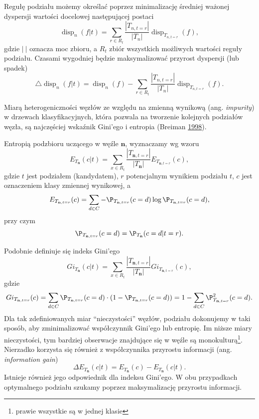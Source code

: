 \documentclass[]{book}
\let\rmarkdownfootnote\footnote%
\def\footnote{\protect\rmarkdownfootnote}
\theoremstyle{plain}
\theoremstyle{definition}
\theoremstyle{definition}
\theoremstyle{definition}
\theoremstyle{definition}
\theoremstyle{remark}
\begin{document}
Regułę podziału możemy określać poprzez minimalizację średniej ważonej dyspersji wartości docelowej następującej postaci
\begin{equation}\label{reg_podz}
        \operatorname{disp}_n(f|t)=\sum_{r\in R_t}\frac{|T_{n,t=r}|}{|T_n|}\operatorname{disp}_{T_{n,t=r}}(f),
\end{equation}
gdzie \(|\  |\) oznacza moc zbioru, a \(R_t\) zbiór wszystkich możliwych wartości reguły podziału. Czasami wygodniej będzie maksymalizować przyrost dyspersji (lub spadek)
\begin{equation}\label{przyrost}
        \bigtriangleup \operatorname{disp}_n(f|t)=\operatorname{disp}_n(f)-\sum_{r\in R_t}\frac{|T_{n,t=r}|}{|T_n|}\operatorname{disp}_{T_{n,t=r}}(f).
\end{equation}

Miarą heterogeniczności węzłów ze względu na zmienną wynikową (ang. \emph{impurity}) w drzewach klasyfikacyjnych, która pozwala na tworzenie kolejnych podziałów węzła, są najczęściej wskaźnik Gini'ego i entropia (Breiman \protect\hyperlink{ref-breiman1998}{1998}).

Entropią podzbioru uczącego w węźle \(\mathbf{n}\), wyznaczamy wg wzoru
\begin{equation}
E_{T_{\mathbf{n}}}(c|t) = \sum_{x\in R_t} \frac{|T_{\mathbf{n}, t=r}|}{|T_{\mathbf{n}}|}E_{T_{\mathbf{n}, t=r}}(c),
\end{equation}
gdzie \(t\) jest podziałem (kandydatem), \(r\) potencjalnym wynikiem podziału \(t\), \(c\) jest oznaczeniem klasy zmiennej wynikowej, a
\begin{equation}
    E_{T_{\mathbf{n}, t=r}}(c) = \sum_{d\in C}-\P_{T_{\mathbf{n}, t=r}}(c=d)\log\P_{T_{\mathbf{n}, t=r}}(c=d),
\end{equation}
przy czym
\begin{equation}
    \P_{T_{\mathbf{n}, t=r}}(c=d)= \P_{T_{\mathbf{n}}}(c=d|t=r).
\end{equation}

Podobnie definiuje się indeks Gini'ego
\begin{equation}
Gi_{T_{\mathbf{n}}}(c|t) = \sum_{x\in R_t} \frac{|T_{\mathbf{n}, t=r}|}{|T_{\mathbf{n}}|}Gi_{T_{\mathbf{n}, t=r}}(c),
\end{equation}
gdzie
\begin{equation}
    Gi_{T_{\mathbf{n}, t=r}}(c) = \sum_{d\in C}\P_{T_{\mathbf{n}, t=r}}(c=d)\cdot(1-\P_{T_{\mathbf{n}, t=r}}(c=d))= 1-\sum_{d\in C}\P^2_{T_{\mathbf{n}, t=r}}(c=d).
\end{equation}
Dla tak zdefiniowanych miar ``nieczystości'' węzłów, podziału dokonujemy w taki sposób, aby zminimalizować współczynnik Gini'ego lub entropię. Im niższe miary nieczystości, tym bardziej obserwacje znajdujące się w węźle są monokulturą\footnote{prawie wszystkie są w jednej klasie}. Nierzadko korzysta się również z współczynnika przyrostu informacji (ang. \emph{information gain})
\begin{equation}
    \Delta E_{T_{\mathbf{n}}}(c|t)=E_{T_{\mathbf{n}}}(c)-E_{T_{\mathbf{n}}}(c|t).
\end{equation}
Istnieje również jego odpowiednik dla indeksu Gini'ego. W obu przypadkach optymalnego podziału szukamy poprzez maksymalizację przyrostu informacji.
\end{document}
